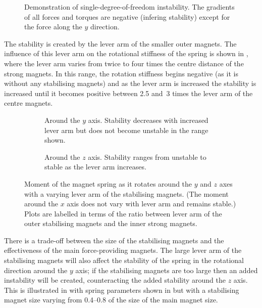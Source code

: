 \documentclass[11pt,a4paper]{memoir}
\begin{document}
\begin{figure}
  \caption{
    Demonstration of single-degree-of-freedom instability.
    The gradients of all forces and torques are negative (infering stability)
    except for the force along the $y$ direction.
  }
\end{figure}

The stability is created by the lever arm of the smaller outer magnets.
The influence of this lever arm on the rotational stiffness of the spring is shown in , where the lever arm varies from twice
to four times the centre distance of the strong magnets.
In this range, the rotation stiffness begins negative (as it is without any stabilising magnets) and as the lever arm is increased the stability is increased until it becomes positive between \num{2.5} and~\num{3} times the lever arm of the centre magnets.

\begin{figure}
  \begin{wide}
    \begin{subfigure}
      \caption{Around the $y$ axis. Stability decreases with increased lever arm but does not become unstable in the range shown.}
    \end{subfigure}
    \hfil
    \begin{subfigure}
      \caption{Around the $z$ axis. Stability ranges from unstable to stable as the lever arm increases.}
    \end{subfigure}
  \end{wide}
  \caption{
    Moment of the magnet spring as it rotates around the $y$ and $z$ axes with a varying lever arm of the stabilising magnets.
    (The moment around the $x$ axis does not vary with lever arm and remains stable.)
    Plots are labelled in terms of the ratio between lever arm of the outer stabilising magnets and the inner strong magnets.
  }
\end{figure}

There is a trade-off between the size of the stabilising magnets and the effectiveness of the main force-providing magnets.
The large lever arm of the stabilising magnets will also affect the stability of the spring in the rotational direction around the $y$ axis; if the stabilising magnets are too large then an added instability will be created, counteracting the added stability around the $z$ axis.
This is illustrated in  with spring parameters shown in  but with a stabilising magnet size varying from \numrange{0.4}{0.8} of the size of the main magnet size.
\end{document}
